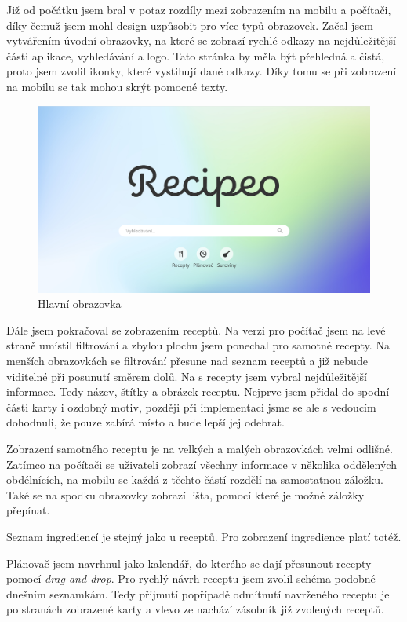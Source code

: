 Již od počátku jsem bral v potaz rozdíly mezi zobrazením na mobilu a počítači, díky čemuž jsem mohl design uzpůsobit
pro více typů obrazovek. Začal jsem vytvářením úvodní obrazovky, na které se zobrazí rychlé odkazy na nejdůležitější části
aplikace, vyhledávání a logo. Tato stránka by měla být přehledná a čistá, proto jsem zvolil ikonky, které vystihují dané
odkazy. Díky tomu se při zobrazení na mobilu se tak mohou skrýt pomocné texty.

\begin{figure}
    \includegraphics[width=\textwidth]{images/main-page}
    \caption{Hlavní obrazovka} \label{picture:recipeo:main-page}
\end{figure}

Dále jsem pokračoval se zobrazením receptů. Na verzi pro počítač jsem na levé straně umístil filtrování a zbylou plochu jsem ponechal
pro samotné recepty. Na menších obrazovkách se filtrování přesune nad seznam receptů a již nebude viditelné při posunutí směrem dolů.
Na  s recepty jsem vybral nejdůležitější informace. Tedy název, štítky a obrázek receptu. Nejprve jsem přidal do spodní části
karty i ozdobný motiv, později při implementaci jsme se ale s vedoucím dohodnuli, že pouze zabírá místo a bude lepší jej odebrat.

Zobrazení samotného receptu je na velkých a malých obrazovkách velmi odlišné. Zatímco na počítači se uživateli zobrazí všechny
informace v několika oddělených obdélnících, na mobilu se každá z těchto částí rozdělí na samostatnou záložku. Také se na spodku
obrazovky zobrazí lišta, pomocí které je možné záložky přepínat.

Seznam ingrediencí je stejný jako u receptů. Pro zobrazení ingredience platí totéž.

Plánovač jsem navrhnul jako kalendář, do kterého se dají přesunout recepty pomocí \emph{drag and drop}. Pro rychlý návrh receptu
jsem zvolil schéma podobné dnešním seznamkám. Tedy přijmutí popřípadě odmítnutí navrženého receptu je po stranách zobrazené karty
a vlevo ze nachází zásobník již zvolených receptů.

